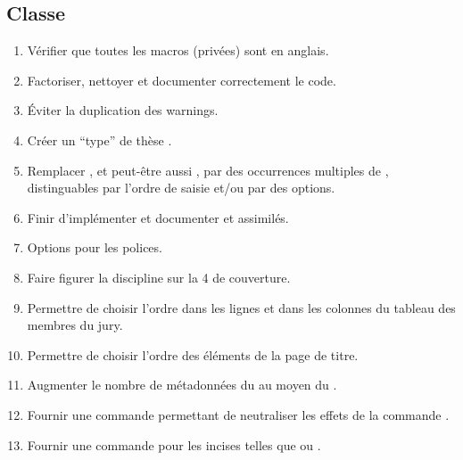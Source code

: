 \subsection{Classe}
\label{sec:classe-ult}

\begin{enumerate}
\item Vérifier que toutes les macros (privées) sont en anglais.
\item Factoriser, nettoyer et documenter correctement le code.
\item Éviter la duplication des warnings.
\item Créer un \enquote{type} de thèse .
\item Remplacer , et peut-être aussi , par des
  occurrences multiples de , distinguables par l'ordre de saisie
  et/ou par des  options.
\item Finir d'implémenter et documenter  et
  assimilés.
\item Options pour les polices.
\item Faire figurer la discipline sur la 4\ieme{} de couverture.
\item Permettre de choisir l'ordre dans les lignes et dans les colonnes du
  tableau des membres du jury.
\item Permettre de choisir l'ordre des éléments de la page de titre.
\item Augmenter le nombre de métadonnées du  au moyen du
  .
\item Fournir une commande  permettant de
  neutraliser les effets de la commande .
\item Fournir une commande  pour les incises telles que
   ou .

\end{enumerate}
